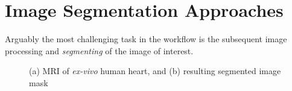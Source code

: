 \section{Image Segmentation Approaches}
\label{Image Segmentation Approaches}

Arguably the most challenging task in the workflow is the subsequent image processing and \textit{segmenting} of the image of interest.

\begin{figure}[ht]
\centering
{}
%
\caption{(a) MRI of \textit{ex-vivo} human heart, and (b) resulting segmented image mask}
\label{fig:seg}
\end{figure}

